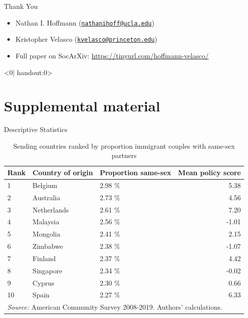\documentclass[
  ignorenonframetext,
]{beamer}
\providecommand{\tightlist}{%
  \setlength{\itemsep}{0pt}\setlength{\parskip}{0pt}}
\begin{document}
\begin{frame}{}
\protect\hypertarget{section}{}
\begin{center}
  \huge{\textcolor{uclablue}{Thank You}}
\end{center}

\begin{itemize}
\tightlist
\item
  Nathan I. Hoffmann
  (\href{mailto:nathanihoff@ucla.edu}{\nolinkurl{nathanihoff@ucla.edu}})
\item
  Kristopher Velasco
  (\href{mailto:kvelasco@princeton.edu}{\nolinkurl{kvelasco@princeton.edu}})
\item
  Full paper on SocArXiv: \url{https://tinyurl.com/hoffmann-velasco/}
\end{itemize}

\end{frame}
\appendix
\begin{frame}<0| handout:0>
\end{frame}

\hypertarget{supplemental-material}{%
\section{Supplemental material}\label{supplemental-material}}

\begin{frame}{Descriptive Statistics}
\protect\hypertarget{descriptive-statistics-5}{}
\begin{table}

\caption{\label{tab:country-tab}Sending countries ranked by proportion immigrant couples with same-sex partners}
\centering
\fontsize{9}{11}\selectfont
\begin{tabular}[t]{lllr}
\toprule
Rank & Country of origin & Proportion same-sex & Mean policy score\\
\midrule
1 & Belgium & 2.98 \% & 5.38\\
2 & Australia & 2.73 \% & 4.56\\
3 & Netherlands & 2.61 \% & 7.20\\
4 & Malaysia & 2.56 \% & -1.01\\
5 & Mongolia & 2.41 \% & 2.15\\
6 & Zimbabwe & 2.38 \% & -1.07\\
7 & Finland & 2.37 \% & 4.42\\
8 & Singapore & 2.34 \% & -0.02\\
9 & Cyprus & 2.30 \% & 0.66\\
10 & Spain & 2.27 \% & 6.33\\
\bottomrule
\multicolumn{4}{l}{\rule{0pt}{1em}\textit{Source:} American Community Survey 2008-2019. Authors' calculations.}\\
\end{tabular}
\end{table}
\end{frame}
\end{document}
